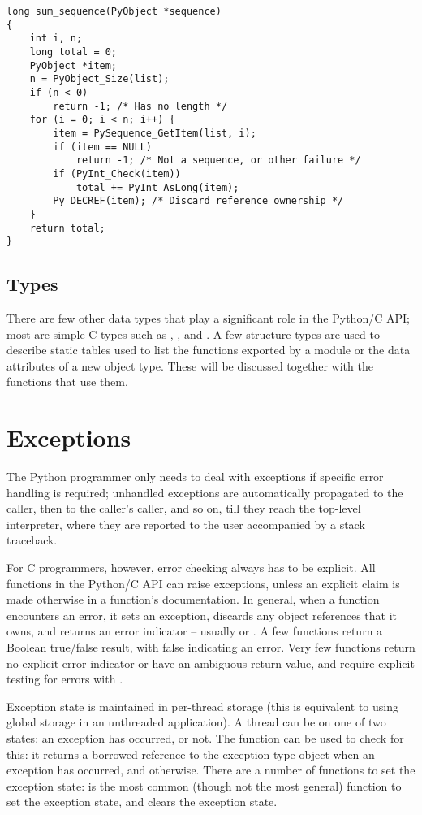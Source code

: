 \begin{verbatim}
long sum_sequence(PyObject *sequence)
{
    int i, n;
    long total = 0;
    PyObject *item;
    n = PyObject_Size(list);
    if (n < 0)
        return -1; /* Has no length */
    for (i = 0; i < n; i++) {
        item = PySequence_GetItem(list, i);
        if (item == NULL)
            return -1; /* Not a sequence, or other failure */
        if (PyInt_Check(item))
            total += PyInt_AsLong(item);
        Py_DECREF(item); /* Discard reference ownership */
    }
    return total;
}
\end{verbatim}

\subsection{Types}

There are few other data types that play a significant role in 
the Python/C API; most are simple C types such as , 
,  and .  A few structure types 
are used to describe static tables used to list the functions exported 
by a module or the data attributes of a new object type.  These will 
be discussed together with the functions that use them.

\section{Exceptions}

The Python programmer only needs to deal with exceptions if specific 
error handling is required; unhandled exceptions are automatically 
propagated to the caller, then to the caller's caller, and so on, till 
they reach the top-level interpreter, where they are reported to the 
user accompanied by a stack traceback.

For C programmers, however, error checking always has to be explicit.  
All functions in the Python/C API can raise exceptions, unless an 
explicit claim is made otherwise in a function's documentation.  In 
general, when a function encounters an error, it sets an exception, 
discards any object references that it owns, and returns an 
error indicator -- usually \NULL{} or .  A few functions 
return a Boolean true/false result, with false indicating an error.
Very few functions return no explicit error indicator or have an 
ambiguous return value, and require explicit testing for errors with 
.

Exception state is maintained in per-thread storage (this is 
equivalent to using global storage in an unthreaded application).  A 
thread can be on one of two states: an exception has occurred, or not.  
The function  can be used to check for this: it 
returns a borrowed reference to the exception type object when an 
exception has occurred, and \NULL{} otherwise.  There are a number 
of functions to set the exception state:  is 
the most common (though not the most general) function to set the 
exception state, and  clears the exception state.

